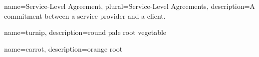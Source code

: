 
{
    name={Service-Level Agreement},
    plural={Service-Level Agreements},
    description={A commitment between a service provider and a client.}
}

{
    name={turnip},
    description={round pale root vegetable}
}

{
    name={carrot},
    description={orange root}
}

